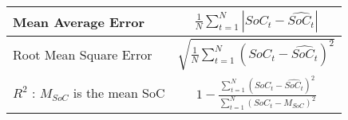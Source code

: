     \begin{tabular}{l c}
        \hline
        Mean Average Error &  $\frac{1}{N}\sum\limits^N_{t=1} |SoC_t-\hat{SoC_t}|$ \\
        \hline
        Root Mean Square Error & $ \sqrt{\frac{1}{N}\sum\limits^N_{t=1} \left(SoC_t-\hat{SoC_t} \right)^2}$ \\
        \hline
        $R^2$ : $M_{SoC}$ is the mean SoC & $1-\frac{\sum\limits^N_{t=1}(SoC_t-\hat{SoC_t})^2}
                {\sum\limits^N_{t=1}(SoC_t-M_{SoC})^2}$ \\
    \end{tabular}

